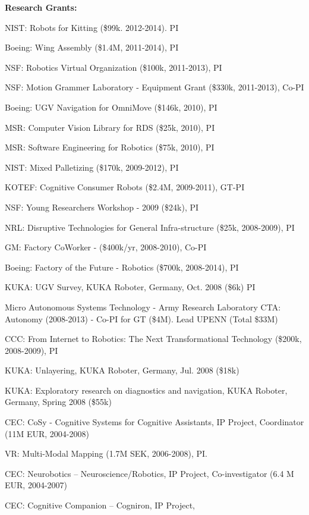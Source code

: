 \documentclass{article}
\begin{document}
\begin{cv}
\begin{cvlist}{\bf Research Grants:}
		\item NIST: Robots for Kitting (\$99k. 2012-2014). PI
		\item Boeing: Wing Assembly (\$1.4M, 2011-2014), PI
		\item NSF: Robotics Virtual Organization (\$100k, 2011-2013), PI
		\item NSF: Motion Grammer Laboratory - Equipment Grant (\$330k, 2011-2013), Co-PI
		\item Boeing: UGV Navigation for OmniMove (\$146k, 2010), PI
		\item MSR: Computer Vision Library for RDS (\$25k, 2010), PI
		\item MSR: Software Engineering for Robotics (\$75k, 2010), PI
		\item NIST: Mixed Palletizing (\$170k, 2009-2012), PI
		\item KOTEF: Cognitive Consumer Robots (\$2.4M, 2009-2011), GT-PI
		\item NSF: Young Researchers Workshop - 2009 (\$24k), PI
		\item NRL: Disruptive Technologies for General Infra-structure  (\$25k, 2008-2009), PI
		\item GM: Factory CoWorker - (\$400k/yr, 2008-2010), Co-PI
		\item Boeing: Factory of the Future - Robotics (\$700k, 2008-2014), PI
		\item KUKA: UGV Survey, KUKA Roboter, Germany, Oct. 2008 (\$6k)  PI%
		\item Micro Autonomous Systems Technology - Army Research Laboratory
		CTA: Autonomy (2008-2013) - Co-PI for GT (\$4M). Lead UPENN (Total \$33M) %
		\item CCC: From Internet to Robotics: The Next Transformational
		Technology (\$200k, 2008-2009), PI %
		\item KUKA: Unlayering, KUKA Roboter, Germany, Jul. 2008 (\$18k) %
		\item KUKA: Exploratory research on diagnostics and navigation, KUKA
		Roboter, Germany, Spring 2008 (\$55k)%
		\item CEC: CoSy - Cognitive Systems for Cognitive Assistants, IP
		Project, Coordinator (11M EUR, 2004-2008)
		\item VR: Multi-Modal Mapping (1.7M SEK, 2006-2008), PI.%
		\item CEC: Neurobotics -- Neuroscience/Robotics, IP Project,
		Co-investigator (6.4 M EUR, 2004-2007)%
		\item CEC: Cognitive Companion -- Cogniron, IP Project,

\end{cvlist}
\end{cv}
\end{document}
